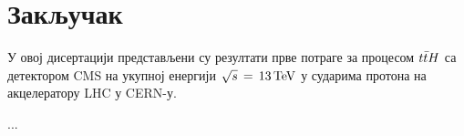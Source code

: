 ﻿%

\chapter{Закључак} %

\label{Закључак} %


У овој дисертацији представљени су резултати прве потраге за процесом $t\bar{t}H$ са детектором CMS на укупној енергији $\sqrt{s}\,=\,13\,\mathrm{TeV}$ у сударима протона на акцелератору LHC у CERN-у.

...